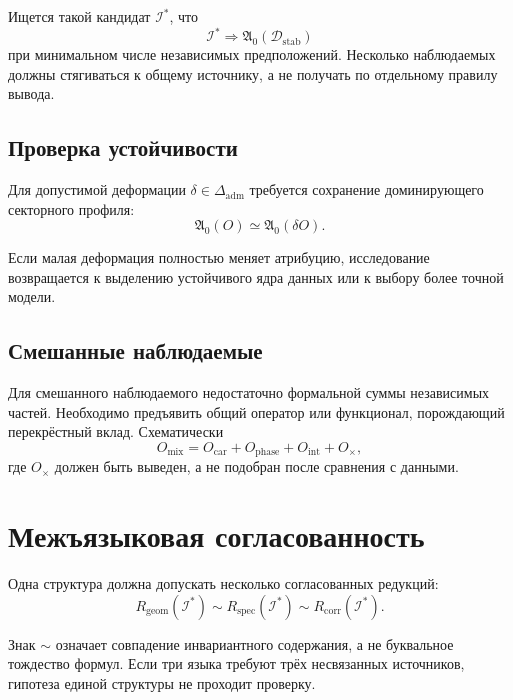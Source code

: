 Ищется такой кандидат $\mathcal I^*$, что
\begin{equation}
 \mathcal I^*\Longrightarrow
 \mathfrak A_0(\mathcal D_{\mathrm{stab}})
\end{equation}
при минимальном числе независимых предположений. Несколько наблюдаемых должны
стягиваться к общему источнику, а не получать по отдельному правилу вывода.

\section{Проверка устойчивости}

Для допустимой деформации $\delta\in\Delta_{\mathrm{adm}}$ требуется
сохранение доминирующего секторного профиля:
\begin{equation}
 \mathfrak A_0(O)\simeq\mathfrak A_0(\delta O).
\end{equation}

Если малая деформация полностью меняет атрибуцию, исследование возвращается к
выделению устойчивого ядра данных или к выбору более точной модели.

\section{Смешанные наблюдаемые}

Для смешанного наблюдаемого недостаточно формальной суммы независимых частей.
Необходимо предъявить общий оператор или функционал, порождающий перекрёстный
вклад. Схематически
\begin{equation}
 O_{\mathrm{mix}}=O_{\mathrm{car}}+O_{\mathrm{phase}}+
 O_{\mathrm{int}}+O_{\times},
\end{equation}
где $O_{\times}$ должен быть выведен, а не подобран после сравнения с данными.

\chapter{Межъязыковая согласованность}

Одна структура должна допускать несколько согласованных редукций:
\begin{equation}
 R_{\mathrm{geom}}(\mathcal I^*)\sim
 R_{\mathrm{spec}}(\mathcal I^*)\sim
 R_{\mathrm{corr}}(\mathcal I^*).
\end{equation}

Знак $\sim$ означает совпадение инвариантного содержания, а не буквальное
тождество формул. Если три языка требуют трёх несвязанных источников, гипотеза
единой структуры не проходит проверку.

